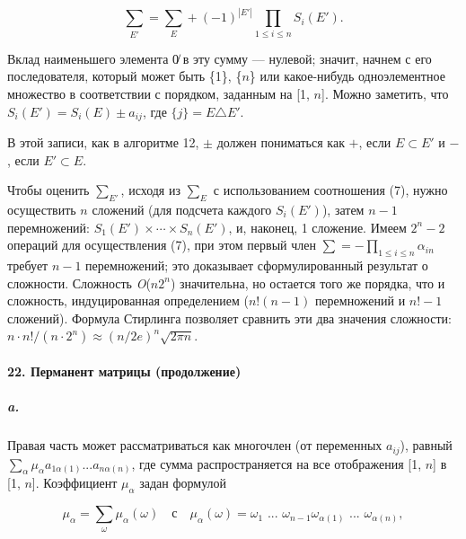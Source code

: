 \documentclass{../../template/mai_book}
\begin{document}
\setcounter{equation}{6}

\begin{equation}
{\sum}_{E'} = {\sum}_E + (-1)^{|E'|} \prod_{1 \leqslant i \leqslant n} S_i(E').
\end{equation}

\noindent
Вклад наименьшего элемента 0̸  в эту сумму — нулевой; значит, начнем с его последователя, который может быть \{1\}, \{$n$\} или какое-нибудь одноэлементное множество в соответствии с порядком, заданным на [1, $n$]. Можно заметить, что $S_i(E') = S_i(E) \pm a_{ij}$, где $\{j\} = E \triangle E'$.

\newpage


\noindent
В этой записи, как в алгоритме 12, $\pm$ должен пониматься как $+$, если $E \subset E'$ и $-$, если $E' \subset E$.

Чтобы оценить ${\sum}_{E'}$, исходя из ${\sum}_E$ с использованием 
соотношения (7), нужно осуществить $n$ сложений (для подсчета каждого $S_i (E')$), затем $n - 1$ перемножений: $S_1(E') \times \cdots \times S_n(E')$, и, наконец, 1 сложение. Имеем $2^n - 2$ операций для осуществления (7), при этом первый член $\sum = -{\prod}_{1 \leqslant i \leqslant n} \alpha_{in}$ требует $n - 1$ перемножений; это доказывает сформулированный результат о сложности. Сложность \textit{O}($n2^n$) значительна, но остается того же порядка, что и сложность, индуцированная определением ($n!(n - 1)$ перемножений и $n! - 1$ сложений). Формула Стирлинга позволяет сравнить эти два значения сложности: $ n \cdot n!/(n \cdot 2^n) \approx (n/2e)^n \sqrt{2\pi n}$.

\paragraph{22. Перманент матрицы (продолжение)}

\subparagraph{a.} Правая часть может рассматриваться как многочлен (от переменных $a_{ij}$), равный ${\sum}_\alpha \mu_\alpha a_{1 \alpha(1)} ... a_{n \alpha(n)}$, где сумма распространяется на все отображения [1, $n$] в [1, $n$]. Коэффициент $\mu_\alpha$ задан формулой

\begin{equation*}
\mu_\alpha = \sum_\omega \mu_\alpha(\omega) \quad \text{с} \quad \mu_\alpha(\omega) = \omega_1 \text{ ... } \omega_{n - 1} \omega_{\alpha(1)} \text{ ... } \omega_{\alpha(n)},
\end{equation*}
\end{document}
